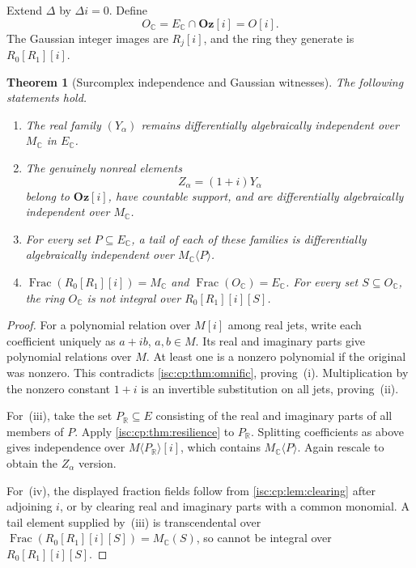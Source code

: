 \documentclass[11pt,letterpaper]{article}
\newtheorem{theorem}{Theorem}[section]
\theoremstyle{definition}
\theoremstyle{remark}
\newcommand{\Oz}{\mathbf{Oz}}
\newcommand{\R}{\mathbb R}
\newcommand{\C}{\mathbb C}
\newcommand{\Frac}{\operatorname{Frac}}
\numberwithin{equation}{section}
\begin{document}
Extend $\Delta$ by $\Delta i=0$. Define
\[
 O_{\C}=E_{\C}\cap\Oz[i]=O[i].
\]
The Gaussian integer images are $R_j[i]$, and the ring they generate is
$R_0[R_1][i]$.

\begin{theorem}[Surcomplex independence and Gaussian witnesses]\label{isc:cp:thm:complex}
The following statements hold.
\begin{enumerate}[label=\textup{(\roman*)}]
\item The real family $(Y_\alpha)$ remains differentially algebraically
independent over $M_{\C}$ in $E_{\C}$.
\item The genuinely nonreal elements
\begin{equation}\label{isc:cp:eq:Zfamily}
 Z_\alpha=(1+i)Y_\alpha
\end{equation}
belong to $\Oz[i]$, have countable support, and are differentially
algebraically independent over $M_{\C}$.
\item For every set $P\subseteq E_{\C}$, a tail of each of these families is
differentially algebraically independent over $M_{\C}\langle P\rangle$.
\item $\Frac(R_0[R_1][i])=M_{\C}$ and $\Frac(O_{\C})=E_{\C}$. For every set
$S\subseteq O_{\C}$, the ring $O_{\C}$ is not integral over
$R_0[R_1][i][S]$.
\end{enumerate}
\end{theorem}
\begin{proof}
For a polynomial relation over $M[i]$ among real jets, write each
coefficient uniquely as $a+ib$, $a,b\in M$. Its real and imaginary parts
give polynomial relations over $M$. At least one is a nonzero polynomial if
the original was nonzero. This contradicts \cref{isc:cp:thm:omnific},
proving~(i). Multiplication by the nonzero constant $1+i$ is an invertible
substitution on all jets, proving~(ii).

For~(iii), take the set $P_{\R}\subseteq E$ consisting of the real and
imaginary parts of all members of $P$. Apply \cref{isc:cp:thm:resilience} to
$P_{\R}$. Splitting coefficients as above gives independence over
$M\langle P_{\R}\rangle[i]$, which contains $M_{\C}\langle P\rangle$. Again
rescale to obtain the $Z_\alpha$ version.

For~(iv), the displayed fraction fields follow from
\cref{isc:cp:lem:clearing} after adjoining $i$, or by clearing real and
imaginary parts with a common monomial. A tail element supplied by~(iii) is
transcendental over $\Frac(R_0[R_1][i][S])=M_{\C}(S)$, so cannot be integral
over $R_0[R_1][i][S]$.
\end{proof}
\end{document}
